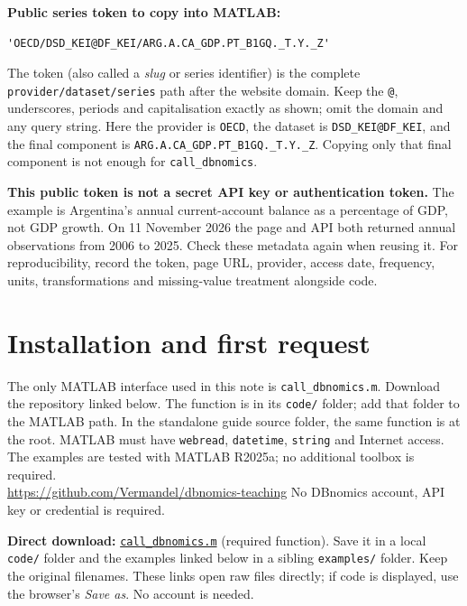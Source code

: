 \documentclass[a4paper,12pt]{article}
\begin{document}
\noindent\textbf{Public series token to copy into MATLAB:}
\begin{verbatim}
'OECD/DSD_KEI@DF_KEI/ARG.A.CA_GDP.PT_B1GQ._T.Y._Z'
\end{verbatim}
The token (also called a \emph{slug} or series identifier) is the complete
\texttt{provider/dataset/series} path after the website domain. Keep the
\texttt{@}, underscores, periods and capitalisation exactly as shown; omit
the domain and any query string. Here the provider is \texttt{OECD}, the
dataset is \texttt{DSD\_KEI@DF\_KEI}, and the final component is
\texttt{ARG.A.CA\_GDP.PT\_B1GQ.\_T.Y.\_Z}. Copying only that final component
is not enough for \texttt{call\_dbnomics}.

\textbf{This public token is not a secret API key or authentication token.}
The example is Argentina's annual current-account balance as a percentage of
GDP, not GDP growth. On 11 November 2026 the page and API both returned annual
observations from 2006 to 2025. Check these metadata again when reusing it.
For reproducibility, record the token, page URL, provider, access date,
frequency, units, transformations and missing-value treatment alongside code.

\clearpage
\section{Installation and first request}

The only MATLAB interface used in this note is \texttt{call\_dbnomics.m}.
Download the repository linked below. The function is in its \texttt{code/} folder; add that folder to the MATLAB path. In the standalone guide source folder, the same function is at the root. MATLAB must
have \texttt{webread}, \texttt{datetime}, \texttt{string} and Internet access. The examples are tested with MATLAB R2025a; no additional toolbox is required.\\
\url{https://github.com/Vermandel/dbnomics-teaching} No DBnomics account, API key or
credential is required.

\noindent\textbf{Direct download:} \href{https://raw.githubusercontent.com/Vermandel/dbnomics-teaching/1ff66c0c5d96b06556e5c0a202877cdc4a117d74/code/call_dbnomics.m}{\texttt{call\_dbnomics.m}} (required function).
Save it in a local \texttt{code/} folder and the examples linked below in a
sibling \texttt{examples/} folder. Keep the original filenames. These links
open raw files directly; if code is displayed, use the browser’s \emph{Save as}.
No account is needed.
\end{document}
